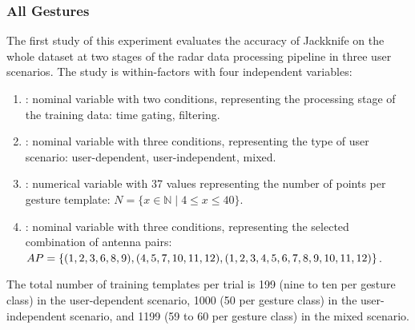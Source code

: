\subsubsection{All Gestures} \label{sec:radar-experiments:gesture-subsets:protocol:all-gestures}
The first study of this experiment evaluates the accuracy of Jackknife on the whole dataset at two stages of the radar data processing pipeline in three user scenarios. The study is within-factors with four independent variables:
\begin{enumerate}
    \item {}: nominal variable with two conditions, representing the processing stage of the training data: time gating, filtering.
    \item {}: nominal variable with three conditions, representing the type of user scenario: user-dependent, user-independent, mixed.
    \item {}: numerical variable with 37 values representing the number of points per gesture template: $N{=}\{x\in\mathbb{N} \mid 4 \leq x \leq 40\}$.
    \item {}: nominal variable with three conditions, representing the selected combination of antenna pairs: $\splitatcommas{AP=\{(1, 2, 3, 6, 8, 9), (4, 5, 7, 10, 11, 12), (1, 2, 3, 4, 5, 6, 7, 8, 9, 10, 11, 12)\}}$.
\end{enumerate}
The total number of training templates per trial is 199 (nine to ten per gesture class) in the user-dependent scenario, 1000 (50 per gesture class) in the user-independent scenario, and 1199 (59 to 60 per gesture class) in the mixed scenario.

